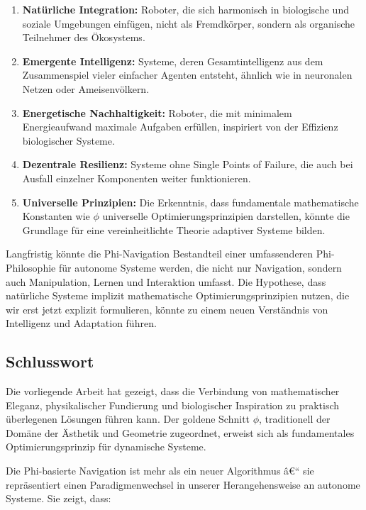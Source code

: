 ﻿\documentclass[a4paper,12pt]{article}
\theoremstyle{definition}
\begin{document}
\begin{enumerate}
	\item \textbf{Natürliche Integration:} Roboter, die sich harmonisch in biologische und soziale Umgebungen einfügen, nicht als Fremdkörper, sondern als organische Teilnehmer des Ökosystems.
	
	\item \textbf{Emergente Intelligenz:} Systeme, deren Gesamtintelligenz aus dem Zusammenspiel vieler einfacher Agenten entsteht, ähnlich wie in neuronalen Netzen oder Ameisenvölkern.
	
	\item \textbf{Energetische Nachhaltigkeit:} Roboter, die mit minimalem Energieaufwand maximale Aufgaben erfüllen, inspiriert von der Effizienz biologischer Systeme.
	
	\item \textbf{Dezentrale Resilienz:} Systeme ohne Single Points of Failure, die auch bei Ausfall einzelner Komponenten weiter funktionieren.
	
	\item \textbf{Universelle Prinzipien:} Die Erkenntnis, dass fundamentale mathematische Konstanten wie $\phi$ universelle Optimierungsprinzipien darstellen, könnte die Grundlage für eine vereinheitlichte Theorie adaptiver Systeme bilden.
\end{enumerate}

Langfristig könnte die Phi-Navigation Bestandteil einer umfassenderen Phi-Philosophie für autonome Systeme werden, die nicht nur Navigation, sondern auch Manipulation, Lernen und Interaktion umfasst. Die Hypothese, dass natürliche Systeme implizit mathematische Optimierungsprinzipien nutzen, die wir erst jetzt explizit formulieren, könnte zu einem neuen Verständnis von Intelligenz und Adaptation führen.

\subsection{Schlusswort}

Die vorliegende Arbeit hat gezeigt, dass die Verbindung von mathematischer Eleganz, physikalischer Fundierung und biologischer Inspiration zu praktisch überlegenen Lösungen führen kann. Der goldene Schnitt $\phi$, traditionell der Domäne der Ästhetik und Geometrie zugeordnet, erweist sich als fundamentales Optimierungsprinzip für dynamische Systeme.

Die Phi-basierte Navigation ist mehr als ein neuer Algorithmus â€“ sie repräsentiert einen Paradigmenwechsel in unserer Herangehensweise an autonome Systeme. Sie zeigt, dass:
\end{document}
